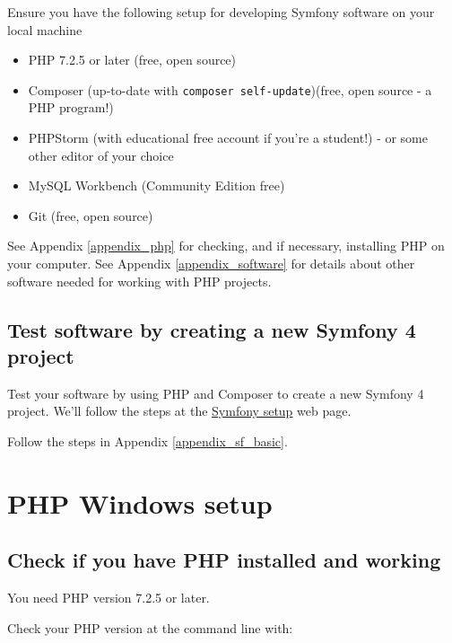 \documentclass[a4paperpaper,openright]{book}
\providecommand{\tightlist}{%
  \setlength{\itemsep}{0pt}\setlength{\parskip}{0pt}}
\begin{document}
Ensure you have the following setup for developing Symfony software on
your local machine

\begin{itemize}
\tightlist
\item
  PHP 7.2.5 or later (free, open source)
\item
  Composer (up-to-date with \texttt{composer\ self-update})(free, open
  source - a PHP program!)
\item
  PHPStorm (with educational free account if you're a student!) - or
  some other editor of your choice
\item
  MySQL Workbench (Community Edition free)
\item
  Git (free, open source)
\end{itemize}

See Appendix \ref{appendix_php} for checking, and if necessary,
installing PHP on your computer. See Appendix \ref{appendix_software}
for details about other software needed for working with PHP projects.

\hypertarget{test-software-by-creating-a-new-symfony-4-project}{%
\section{Test software by creating a new Symfony 4
project}\label{test-software-by-creating-a-new-symfony-4-project}}

Test your software by using PHP and Composer to create a new Symfony 4
project. We'll follow the steps at the
\href{https://symfony.com/doc/current/setup.html}{Symfony setup} web
page.

Follow the steps in Appendix \ref{appendix_sf_basic}.

\hypertarget{php-windows-setup}{%
\chapter{\texorpdfstring{PHP Windows
setup\label{appendix_php}}{PHP Windows setup}}\label{php-windows-setup}}

\hypertarget{check-if-you-have-php-installed-and-working}{%
\section{Check if you have PHP installed and
working}\label{check-if-you-have-php-installed-and-working}}

You need PHP version 7.2.5 or later.

Check your PHP version at the command line with:
\end{document}
